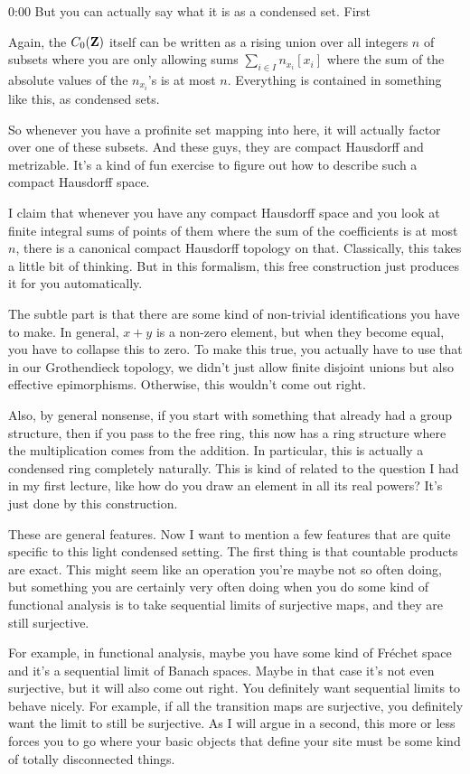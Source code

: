 \begin{unfinished}{0:00}
But you can actually say what it is as a condensed set. First

Again, the $C_0(\mathbf Z)$ itself can be written as a rising union over all integers $n$ of subsets where you are only allowing sums $\sum_{i\in I} n_{x_i}[x_i]$ where the sum of the absolute values of the $n_{x_i}$'s is at most $n$. Everything is contained in something like this, as condensed sets.

So whenever you have a profinite set mapping into here, it will actually factor over one of these subsets. And these guys, they are compact Hausdorff and metrizable. It's a kind of fun exercise to figure out how to describe such a compact Hausdorff space.

I claim that whenever you have any compact Hausdorff space and you look at finite integral sums of points of them where the sum of the coefficients is at most $n$, there is a canonical compact Hausdorff topology on that. Classically, this takes a little bit of thinking. But in this formalism, this free construction just produces it for you automatically.

The subtle part is that there are some kind of non-trivial identifications you have to make. In general, $x+y$ is a non-zero element, but when they become equal, you have to collapse this to zero. To make this true, you actually have to use that in our Grothendieck topology, we didn't just allow finite disjoint unions but also effective epimorphisms. Otherwise, this wouldn't come out right.

Also, by general nonsense, if you start with something that already had a group structure, then if you pass to the free ring, this now has a ring structure where the multiplication comes from the addition. In particular, this is actually a condensed ring completely naturally. This is kind of related to the question I had in my first lecture, like how do you draw an element in all its real powers? It's just done by this construction.

These are general features. Now I want to mention a few features that are quite specific to this light condensed setting. The first thing is that countable products are exact. This might seem like an operation you're maybe not so often doing, but something you are certainly very often doing when you do some kind of functional analysis is to take sequential limits of surjective maps, and they are still surjective.

For example, in functional analysis, maybe you have some kind of Fréchet space and it's a sequential limit of Banach spaces. Maybe in that case it's not even surjective, but it will also come out right. You definitely want sequential limits to behave nicely. For example, if all the transition maps are surjective, you definitely want the limit to still be surjective. As I will argue in a second, this more or less forces you to go where your basic objects that define your site must be some kind of totally disconnected things.


\end{unfinished}
